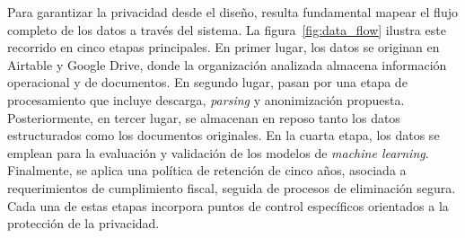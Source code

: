 Para garantizar la privacidad desde el diseño, resulta fundamental mapear el flujo completo de los datos a través del sistema. La figura~\ref{fig:data_flow} ilustra este recorrido en cinco etapas principales. En primer lugar, los datos se originan en Airtable y Google Drive, donde la organización analizada almacena información operacional y de documentos. En segundo lugar, pasan por una etapa de procesamiento que incluye descarga, \textit{parsing} y anonimización propuesta. Posteriormente, en tercer lugar, se almacenan en reposo tanto los datos estructurados como los documentos originales. En la cuarta etapa, los datos se emplean para la evaluación y validación de los modelos de \textit{machine learning}. Finalmente, se aplica una política de retención de cinco años, asociada a requerimientos de cumplimiento fiscal, seguida de procesos de eliminación segura. Cada una de estas etapas incorpora puntos de control específicos orientados a la protección de la privacidad.

